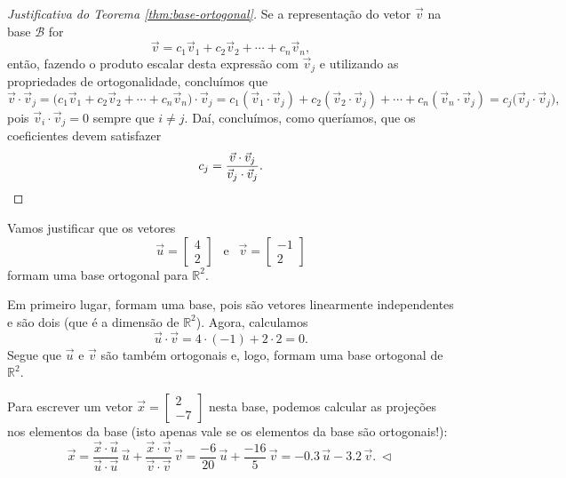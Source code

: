 \begin{proof}[Justificativa do Teorema \ref{thm:base-ortogonal}]
	Se a representação do vetor $\vec{v}$ na base $\mathcal{B}$ for
	\begin{equation}
	\vec{v} = c_1 \vec{v}_1 + c_2 \vec{v}_2 + \cdots + c_n \vec{v}_n,
	\end{equation} então, fazendo o produto escalar desta expressão com $\vec{v}_j$ e utilizando as propriedades de ortogonalidade, concluímos que
	\begin{equation}
	\vec{v} \cdot \vec{v}_j = \big( c_1 \vec{v}_1 + c_2 \vec{v}_2 + \cdots + c_n \vec{v}_n \big) \cdot \vec{v}_j = c_1 (\vec{v}_1\cdot \vec{v}_j) + c_2 (\vec{v}_2\cdot \vec{v}_j) + \cdots + c_n (\vec{v}_n\cdot \vec{v}_j) = c_j \big( \vec{v}_j \cdot \vec{v}_j \big),
	\end{equation} pois $\vec{v}_i \cdot \vec{v}_j = 0$ sempre que $i \neq j$. Daí, concluímos, como queríamos, que os coeficientes devem satisfazer
	\begin{equation}
	c_j = \frac{\vec{v} \cdot \vec{v}_j}{\vec{v}_j \cdot \vec{v}_j}. \qedhere
	\end{equation}
\end{proof}

\begin{ex}
	Vamos justificar que os vetores
	\begin{equation}
	\vec{u} =
	\begin{bmatrix}
	4 \\ 2
	\end{bmatrix} \ \ \text{ e }\ \
	\vec{v} =
	\begin{bmatrix}
	-1 \\ 2
	\end{bmatrix}
	\end{equation} formam uma base ortogonal para $\mathbb{R}^2$.

	Em primeiro lugar, formam uma base, pois são vetores linearmente independentes e são dois (que é a dimensão de $\mathbb{R}^2$). Agora, calculamos
	\begin{equation}
	\vec{u} \cdot \vec{v} = 4\cdot (-1) + 2\cdot 2 = 0.
	\end{equation} Segue que $\vec{u}$ e $\vec{v}$ são também ortogonais e, logo, formam uma base ortogonal de $\mathbb{R}^2$.

	Para escrever um vetor $\vec{x} =
	\begin{bmatrix}
	2 \\ -7
	\end{bmatrix}$ nesta base, podemos calcular as projeções nos elementos da base (isto apenas vale se os elementos da base são ortogonais!):
	\begin{equation}
	\vec{x} = \frac{\vec{x} \cdot \vec{u}}{\vec{u} \cdot \vec{u}} \, \vec{u} + \frac{\vec{x} \cdot \vec{v}}{\vec{v} \cdot \vec{v}} \, \vec{v} = \frac{-6}{20} \, \vec{u} + \frac{-16}{5} \, \vec{v} = -0.3 \, \vec{u} -3.2 \, \vec{v}. \ \lhd
	\end{equation}
\end{ex}


